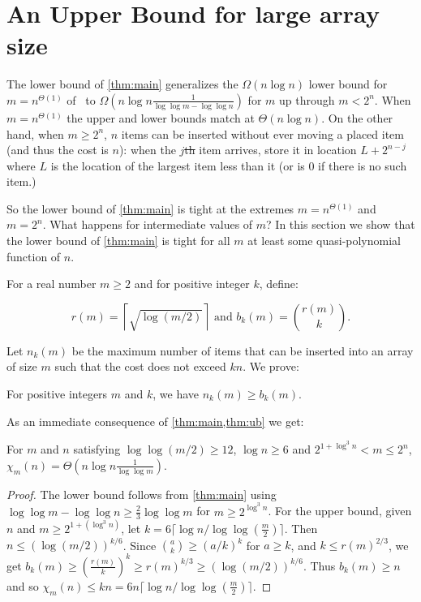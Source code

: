 \documentclass[unicode,review]{siamart1116}
\numberwithin{theorem}{section}
\providecommand{\DIFadd}[1]{{\protect\color{blue}\uwave{#1}}} %
\providecommand{\DIFdel}[1]{{\protect\color{red}\sout{#1}}}                      %
\providecommand{\DIFaddbegin}{} %
\providecommand{\DIFaddend}{} %
\providecommand{\DIFdelbegin}{} %
\providecommand{\DIFdelend}{} %
\newcommand{\DIFscaledelfig}{0.5}
\newlength{\DIFdelgraphicswidth} %
\newlength{\DIFdelgraphicsheight} %
\newcommand{\DIFaddincludegraphics}[2][]{{\color{blue}\fbox{\DIFOincludegraphics[#1]{#2}}}} %
\newcommand{\DIFdelincludegraphics}[2][]{%
\sbox{\DIFdelgraphicsbox}{\DIFOincludegraphics[#1]{#2}}%
\settoboxwidth{\DIFdelgraphicswidth}{\DIFdelgraphicsbox} %
\settoboxtotalheight{\DIFdelgraphicsheight}{\DIFdelgraphicsbox} %
\scalebox{\DIFscaledelfig}{%
\parbox[b]{\DIFdelgraphicswidth}{\usebox{\DIFdelgraphicsbox}\\[-\baselineskip] \rule{\DIFdelgraphicswidth}{0em}}\llap{\resizebox{\DIFdelgraphicswidth}{\DIFdelgraphicsheight}{%
\setlength{\unitlength}{\DIFdelgraphicswidth}%
\begin{picture}(1,1)%
\thicklines\linethickness{2pt} %
{\color[rgb]{1,0,0}\put(0,0){\framebox(1,1){}}}%
{\color[rgb]{1,0,0}\put(0,0){\line( 1,1){1}}}%
{\color[rgb]{1,0,0}\put(0,1){\line(1,-1){1}}}%
\end{picture}%
}\hspace*{3pt}}} %
} %
\DeclareRobustCommand{\DIFaddbegin}{\DIFOaddbegin \let\includegraphics\DIFaddincludegraphics} %
\DeclareRobustCommand{\DIFaddend}{\DIFOaddend \let\includegraphics\DIFOincludegraphics} %
\DeclareRobustCommand{\DIFdelbegin}{\DIFOdelbegin \let\includegraphics\DIFdelincludegraphics} %
\DeclareRobustCommand{\DIFdelend}{\DIFOaddend \let\includegraphics\DIFOincludegraphics} %
\begin{document}
\section{An Upper Bound for large array size}
\label{s-ub}

The lower bound of \cref{thm:main} generalizes the $\Omega(n \log n)$ lower bound 
for $m=n^{\Theta(1)}$ of~\cite{DSZ04} to  $\Omega(n\log n \frac{1}{\log\log m -\log\log n})$  for  $m$ up through $m<2^n$.   
When $m=n^{\Theta(1)}$ the upper and lower bounds match at $\Theta(n \log n)$.  On the other hand, when
$m \geq 2^n$,  $n$ items can be inserted without ever moving a placed item (and thus the cost is $n$):
when the $j$\DIFdelbegin \DIFdel{th }\DIFdelend \DIFaddbegin \DIFadd{-th }\DIFaddend item arrives, 
store it in location $L+2^{n-j}$ where $L$ is the location of the largest item less than it
(or is 0 if there is no such item.)

So the lower bound of \cref{thm:main} is tight at the extremes $m=n^{\Theta(1)}$ and $m=2^n$.  What happens for intermediate values of $m$?
In this section we show that the  lower bound of \cref{thm:main} is tight for all $m$ at least some quasi-polynomial function of $n$.  

For a real number $m \geq 2$ and for positive integer $k$, define:

\[
r(m) = \left\lceil \sqrt{\log(m/2)}  \right\rceil \text{ and } 
b_k(m)  =  \binom{r(m)}{k}.
\]


Let $n_k(m)$ be the maximum number of items that can be inserted into an array of size $m$ such that the cost does not exceed $kn$. We prove:

\begin{theorem}
\label{thm:ub}
For positive integers $m$ and $k$, we have $n_k(m) \geq b_k(m)$. 
\end{theorem}

As an immediate consequence of \cref{thm:main,thm:ub} we get:

\begin{corollary}
For $m$ and $n$ satisfying $\log \log (m/2) \ge 12$, $\log n \ge 6$ and $2^{1+\log^3 n} < m \leq 2^n$, $\chi_m(n) = \Theta(n \log n \frac{1}{\log\log m})$.
\end{corollary}

\begin{proof}
The lower bound follows from \cref{thm:main} using $\log\log m - \log\log n \geq \frac{2}{3} \log\log m$
for   $m\geq 2^{\log^3 n}$.
For the upper bound, given $n$ and $m \geq 2^{1+(\log^3 n)}$, let $k= 6\lceil \log n/\log\log (\frac{m}{2}) \rceil$.
Then $n \leq (\log (m/2))^{k/6}$. Since $\binom{a}{k} \geq (a/k)^k$ for $a\ge k$,   
and $k \leq r(m)^{2/3}$, we get
$b_k(m) \geq (\frac{r(m)}{k})^k \geq r(m)^{k/3} \geq (\log (m/2))^{k/6}$. Thus $b_k(m) \ge n$ and so
$\chi_m(n) \leq  k n = 6 n \lceil \log n/\log\log (\frac{m}{2}) \rceil $. 
\end{proof}
\end{document}
